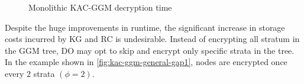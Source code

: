 \documentclass[hyp,a4paper,12pt,openbib]{socreport}
\begin{document}
\begin{figure}
\centering
{}
\caption{Monolithic KAC-GGM decryption time}
\label{fig:kac-ggm-graph}
\end{figure}




Despite the huge improvements in runtime, the significant increase in storage costs incurred by KG and RC is undesirable. Instead of encrypting all stratum in the GGM tree, DO may opt to skip and encrypt only specific strata in the tree. In the example shown in \cref{fig:kac-ggm-general-gap1}, nodes are encrypted once every $2$ strata $(\phi = 2)$. 
\end{document}
